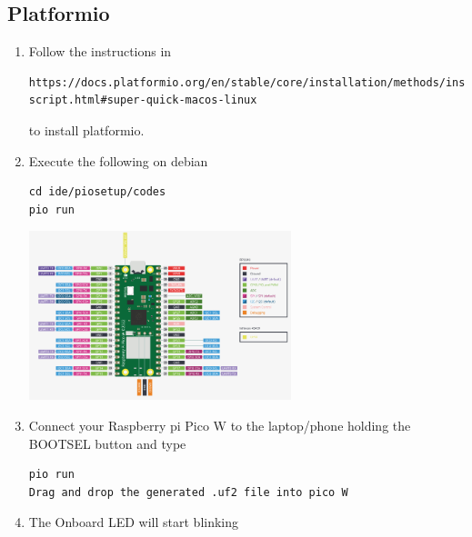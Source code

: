 \subsection{Platformio }
\begin{enumerate}[label=\arabic*.,ref=\theenumi]
\item Follow the instructions in 
\begin{lstlisting}
https://docs.platformio.org/en/stable/core/installation/methods/installer-script.html#super-quick-macos-linux
\end{lstlisting}
to install platformio.
\item Execute the following on debian
\begin{lstlisting}
cd ide/piosetup/codes
pio run
\end{lstlisting}
\begin{center}
    \includegraphics[width=0.6\textwidth, height=0.3\textheight]{installation/picowpinout.jpg}
    \vspace{0.5em} %
\end{center}
\vspace{1em} %
\item Connect your Raspberry pi Pico W to the  laptop/phone holding the BOOTSEL button and type
\begin{lstlisting}
pio run 
Drag and drop the generated .uf2 file into pico W 
\end{lstlisting}
\item The Onboard LED will start blinking
\end{enumerate}





